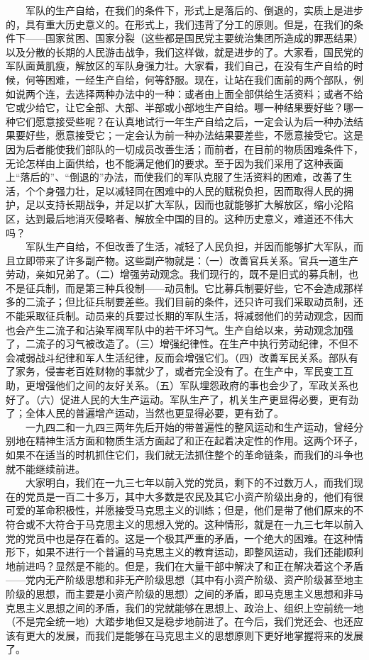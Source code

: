 \documentclass[cn,11pt,chinese]{elegantbook}
\begin{document}
　　军队的生产自给，在我们的条件下，形式上是落后的、倒退的，实质上是进步的，具有重大历史意义的。在形式上，我们违背了分工的原则。但是，在我们的条件下——国家贫困、国家分裂（这些都是国民党主要统治集团所造成的罪恶结果）以及分散的长期的人民游击战争，我们这样做，就是进步的了。大家看，国民党的军队面黄肌瘦，解放区的军队身强力壮。大家看，我们自己，在没有生产自给的时候，何等困难，一经生产自给，何等舒服。现在，让站在我们面前的两个部队，例如说两个连，去选择两种办法中的一种：或者由上面全部供给生活资料；或者不给它或少给它，让它全部、大部、半部或小部地生产自给。哪一种结果要好些？哪一种它们愿意接受些呢？在认真地试行一年生产自给之后，一定会认为后一种办法结果要好些，愿意接受它；一定会认为前一种办法结果要差些，不愿意接受它。这是因为后者能使我们部队的一切成员改善生活；而前者，在目前的物质困难条件下，无论怎样由上面供给，也不能满足他们的要求。至于因为我们采用了这种表面上“落后的”、“倒退的”办法，而使我们的军队克服了生活资料的困难，改善了生活，个个身强力壮，足以减轻同在困难中的人民的赋税负担，因而取得人民的拥护，足以支持长期战争，并足以扩大军队，因而也就能够扩大解放区，缩小沦陷区，达到最后地消灭侵略者、解放全中国的目的。这种历史意义，难道还不伟大吗？\\
　　军队生产自给，不但改善了生活，减轻了人民负担，并因而能够扩大军队，而且立即带来了许多副产物。这些副产物就是：（一）改善官兵关系。官兵一道生产劳动，亲如兄弟了。（二）增强劳动观念。我们现行的，既不是旧式的募兵制，也不是征兵制，而是第三种兵役制——动员制。它比募兵制要好些，它不会造成那样多的二流子；但比征兵制要差些。我们目前的条件，还只许可我们采取动员制，还不能采取征兵制。动员来的兵要过长期的军队生活，将减弱他们的劳动观念，因而也会产生二流子和沾染军阀军队中的若干坏习气。生产自给以来，劳动观念加强了，二流子的习气被改造了。（三）增强纪律性。在生产中执行劳动纪律，不但不会减弱战斗纪律和军人生活纪律，反而会增强它们。（四）改善军民关系。部队有了家务，侵害老百姓财物的事就少了，或者完全没有了。在生产中，军民变工互助，更增强他们之间的友好关系。（五）军队埋怨政府的事也会少了，军政关系也好了。（六）促进人民的大生产运动。军队生产了，机关生产更显得必要，更有劲了；全体人民的普遍增产运动，当然也更显得必要，更有劲了。\\
　　一九四二和一九四三两年先后开始的带普遍性的整风运动和生产运动，曾经分别地在精神生活方面和物质生活方面起了和正在起着决定性的作用。这两个环子，如果不在适当的时机抓住它们，我们就无法抓住整个的革命链条，而我们的斗争也就不能继续前进。\\
　　大家明白，我们在一九三七年以前入党的党员，剩下的不过数万人，而我们现在的党员是一百二十多万，其中大多数是农民及其它小资产阶级出身的，他们有很可爱的革命积极性，并愿接受马克思主义的训练；但是，他们是带了他们原来的不符合或不大符合于马克思主义的思想入党的。这种情形，就是在一九三七年以前入党的党员中也是存在着的。这是一个极其严重的矛盾，一个绝大的困难。在这种情形下，如果不进行一个普遍的马克思主义的教育运动，即整风运动，我们还能顺利地前进吗？显然是不能的。但是，我们在大量干部中解决了和正在解决着这个矛盾——党内无产阶级思想和非无产阶级思想（其中有小资产阶级、资产阶级甚至地主阶级的思想，而主要是小资产阶级的思想）之间的矛盾，即马克思主义思想和非马克思主义思想之间的矛盾，我们的党就能够在思想上、政治上、组织上空前统一地（不是完全统一地）大踏步地但又是稳步地前进了。在今后，我们党还会、也还应该有更大的发展，而我们是能够在马克思主义的思想原则下更好地掌握将来的发展了。\\
\end{document}
